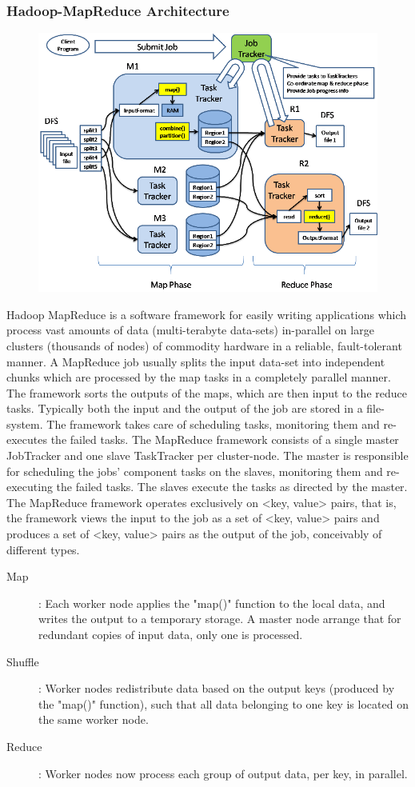 \subsubsection{Hadoop-MapReduce Architecture}
\begin{figure}[htp]
\centering
\includegraphics[scale=0.7]{Figures/fig-5.png}
\caption{}
\label{}
\end{figure}
Hadoop MapReduce is a software framework for easily writing applications which process vast amounts of data (multi-terabyte data-sets) in-parallel on large clusters (thousands of nodes) of commodity hardware in a reliable, fault-tolerant manner.
A MapReduce job usually splits the input data-set into independent chunks which are processed by the map tasks in a completely parallel manner. The framework sorts the outputs of the maps, which are then input to the reduce tasks. Typically both the input and the output of the job are stored in a file-system. The framework takes care of scheduling tasks, monitoring them and re-executes the failed tasks.
The MapReduce framework consists of a single master JobTracker and one slave TaskTracker per cluster-node. The master is responsible for scheduling the jobs' component tasks on the slaves, monitoring them and re-executing the failed tasks. The slaves execute the tasks as directed by the master.
The MapReduce framework operates exclusively on <key, value> pairs, that is, the framework views the input to the job as a set of <key, value> pairs and produces a set of <key, value> pairs as the output of the job, conceivably of different types.
\begin{description}
\item[Map]: Each worker node applies the "map()" function to the local data, and writes the output to a temporary storage. A master node arrange that for redundant copies of input data, only one is processed.

\item[Shuffle]: Worker nodes redistribute data based on the output keys (produced by the "map()" function), such that all data belonging to one key is located on the same worker node.
\item[Reduce]: Worker nodes now process each group of output data, per key, in parallel.
\end{description}

